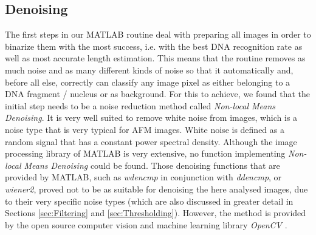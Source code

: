 \documentclass{article}
\begin{document}
\subsection{Denoising}\label{sec:Denoising}
The first steps in our MATLAB routine deal with preparing all images in order to binarize them with the most success, i.e. with the best DNA recognition rate as well as most accurate length estimation. This means that the routine removes as much noise and as many different kinds of noise so that it automatically and, before all else, correctly can classify any image pixel as either belonging to a DNA fragment / nucleus or as background.
For this to achieve, we found that the initial step needs to be a noise reduction method called \textit{Non-local Means Denoising}. It is very well suited to remove white noise from images, which is a noise type that is very typical for AFM images. White noise is defined as a random signal that has a constant power spectral density. Although the image processing library of MATLAB is very extensive, no function implementing \textit{Non-local Means Denoising} could be found. Those denoising functions that are provided by MATLAB, such as \textit{wdencmp} in conjunction with \textit{ddencmp}, or \textit{wiener2}, proved not to be as suitable for denoising the here analysed images, due to their very specific noise types (which are also discussed in greater detail in Sections \ref{sec:Filtering} and \ref{sec:Thresholding}). However, the method is provided by the open source computer vision and machine learning library \textit{OpenCV} \cite{itseez2016opencvman} \cite{itseez2016opencvlib}. 
\end{document}
